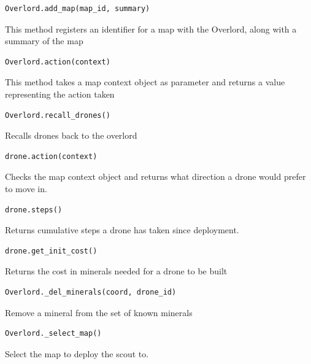 \documentclass[12pt]{article}
\begin{document}
\begin{lstlisting}[basicstyle=\large]
Overlord.add_map(map_id, summary)
\end{lstlisting}
\large{This method registers an identifier for a map with the Overlord, along with a summary of the map}\\
\begin{lstlisting}[basicstyle=\large]
Overlord.action(context)
\end{lstlisting}
\large{This method takes a map context object as parameter and returns a value representing the action taken}\\
\newpage
\begin{lstlisting}[basicstyle=\large]
Overlord.recall_drones()
\end{lstlisting}
\large{Recalls drones back to the overlord}\\

\begin{lstlisting}[basicstyle=\large]
drone.action(context)
\end{lstlisting}
\large{Checks the map context object and returns what direction a drone would prefer to move in.}\\

\begin{lstlisting}[basicstyle=\large]
drone.steps()
\end{lstlisting}
\large{Returns cumulative steps a drone has taken since deployment.}\\

\begin{lstlisting}[basicstyle=\large]
drone.get_init_cost()
\end{lstlisting}
\large{Returns the cost in minerals needed for a drone to be built}\\

\begin{lstlisting}[basicstyle=\large]
Overlord._del_minerals(coord, drone_id)
\end{lstlisting}
\large{Remove a mineral from the set of known minerals}\\

\begin{lstlisting}[basicstyle=\large]
Overlord._select_map()
\end{lstlisting}
\large{Select the map to deploy the scout to.}\\
\end{document}
